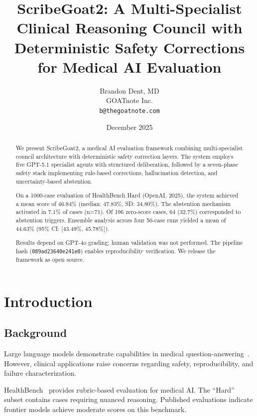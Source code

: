 \documentclass[10pt,twocolumn]{article}
\title{ScribeGoat2: A Multi-Specialist Clinical Reasoning Council with Deterministic Safety Corrections for Medical AI Evaluation}
\author{
  Brandon Dent, MD\\
  GOATnote Inc.\\
  \texttt{b@thegoatnote.com}
}
\date{December 2025}
\begin{document}
\maketitle

\begin{abstract}
We present ScribeGoat2, a medical AI evaluation framework combining multi-specialist council architecture with deterministic safety correction layers. The system employs five GPT-5.1 specialist agents with structured deliberation, followed by a seven-phase safety stack implementing rule-based corrections, hallucination detection, and uncertainty-based abstention.

On a 1000-case evaluation of HealthBench Hard (OpenAI, 2025), the system achieved a mean score of 46.84\% (median: 47.83\%, SD: 34.80\%). The abstention mechanism activated in 7.1\% of cases (n=71). Of 196 zero-score cases, 64 (32.7\%) corresponded to abstention triggers. Ensemble analysis across four 50-case runs yielded a mean of 44.63\% (95\% CI: [43.49\%, 45.78\%]).

Results depend on GPT-4o grading; human validation was not performed. The pipeline hash (\texttt{089ad23640e241e0}) enables reproducibility verification. We release the framework as open source.
\end{abstract}

\section{Introduction}

\subsection{Background}

Large language models demonstrate capabilities in medical question-answering~\cite{nori2023gpt4,singhal2023medpalm}. However, clinical applications raise concerns regarding safety, reproducibility, and failure characterization.

HealthBench~\cite{healthbench2025} provides rubric-based evaluation for medical AI. The ``Hard'' subset contains cases requiring nuanced reasoning. Published evaluations indicate frontier models achieve moderate scores on this benchmark.
\end{document}
